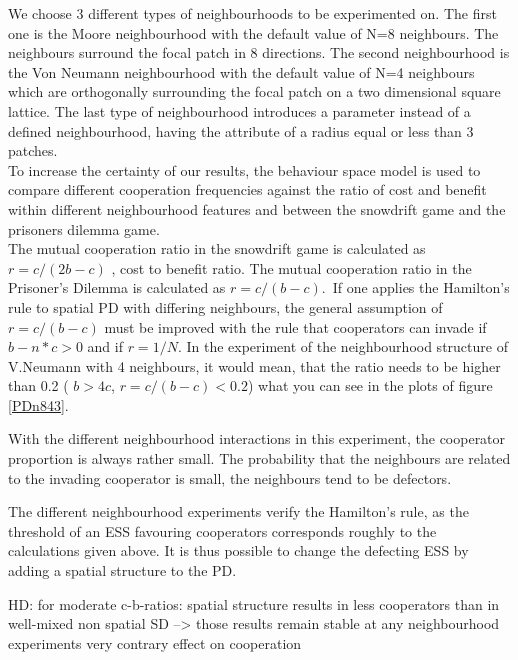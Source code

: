 \documentclass[DIV=calc, paper=a4, fontsize=11pt, twocolumn]{scrartcl}	 %
\begin{document}
We choose 3 different types of neighbourhoods to be experimented on. The first one is the Moore neighbourhood with the default value of N=8 neighbours. The neighbours surround the focal patch in 8 directions. The second neighbourhood is the Von Neumann neighbourhood with the default value of N=4 neighbours which are orthogonally surrounding the focal patch on a two dimensional square lattice. The last type of neighbourhood introduces a parameter instead of a defined neighbourhood, having the attribute of a radius equal or less than 3 patches. \\
To increase the certainty of our results, the behaviour space model is used to compare different cooperation frequencies against the ratio of cost and benefit within different neighbourhood features and between the snowdrift game and the prisoners dilemma game. \\
The mutual cooperation ratio in the snowdrift game is calculated as $r = c / (2b-c)$ , cost to benefit ratio. The mutual cooperation ratio in the Prisoner's Dilemma is calculated as $r = c/ (b-c) $.\
If one applies the Hamilton's rule to spatial PD with differing neighbours, the general assumption of $r = c / (b-c) $ must be improved with the rule that cooperators can invade if $ b - n * c > 0$ and if $ r = 1/N $. In the experiment of the neighbourhood structure of V.Neumann with 4 neighbours, it would mean, that the ratio needs to be higher than 0.2 ( $b > 4c$, $ r = c/(b-c) < 0.2$) what you can see in the plots of figure \ref{PDn843}. 

With the different neighbourhood interactions in this experiment, the cooperator proportion is always rather small. The probability that the neighbours are related to the invading cooperator is small, the neighbours tend to be defectors. 

The different neighbourhood experiments verify the Hamilton's rule, as the threshold of an ESS favouring cooperators corresponds roughly to the calculations given above. It is thus possible to change the defecting ESS by adding a spatial structure to the PD. 

HD: 
for moderate c-b-ratios: spatial structure results in less cooperators than in well-mixed non spatial SD --> those results remain stable at any neighbourhood experiments 
very contrary effect on cooperation
\end{document}
